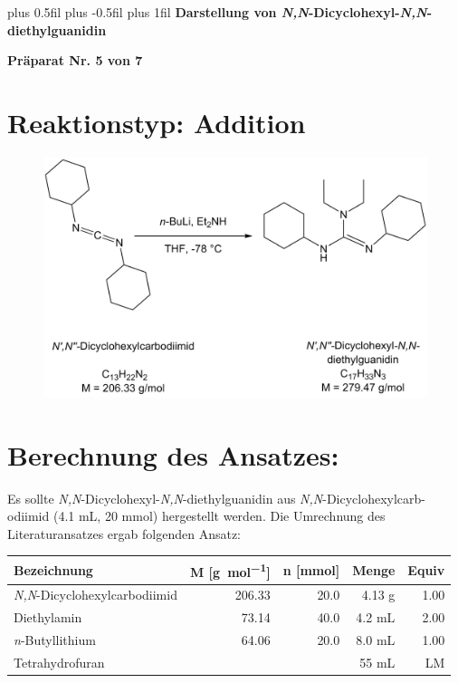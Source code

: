 \documentclass[12pt]{article}
\begin{document}
\begin{onehalfspace}

\begingroup
\leftskip=0cm plus 0.5fil \rightskip=0cm plus -0.5fil
\parfillskip=0cm plus 1fil
 \textbf{\large Darstellung von \textit{N\textquotesingle,N\textquotesingle\textquotesingle}-Dicyclohexyl-\textit{N,N}-diethylguanidin}\par
\endgroup
\begin{center}
 \textbf{Präparat Nr. 5 von 7}
\end{center}
\section{Reaktionstyp: \textnormal{Addition} }
\begin{figure}[ht]
\centering
\includegraphics[width=\textwidth]{reaktion.png}
\end{figure}


\section{Berechnung des Ansatzes: }
Es sollte \textit{N\textquotesingle,N\textquotesingle\textquotesingle}-Dicyclohexyl-\textit{N,N}-diethylguanidin aus \textit{N,N}-Dicyclohexylcarb-odiimid (4.1 \si{\milli\liter}, 20 mmol) hergestellt werden. Die Umrechnung des Literaturansatzes ergab folgenden Ansatz:\cite{vor}\par
\noindent
\begin{tabularx}{\textwidth}{Xrrrr}
\toprule
\textbf{ Bezeichnung }&\textbf{M [\si{\gram\per\mol}]} & \textbf{ n [\si{\milli\mol}]} & \textbf{Menge} &  \textbf{Equiv}\\
\midrule
 \textit{N,N}-Dicyclohexylcarbodiimid & 206.33 & 20.0  & 4.13 \si{\gram} & 1.00 \\
 Diethylamin   & 73.14   &  40.0  &  4.2 \si{\milli\liter} & 2.00 \\
\textit{n}-Butyllithium    & 64.06   &  20.0  &  8.0 \si{\milli\liter} & 1.00 \\
 Tetrahydrofuran &   &  & 55  \si{\milli\liter}& LM \\
\bottomrule
\end{tabularx}\\


\end{onehalfspace}
\end{document}
